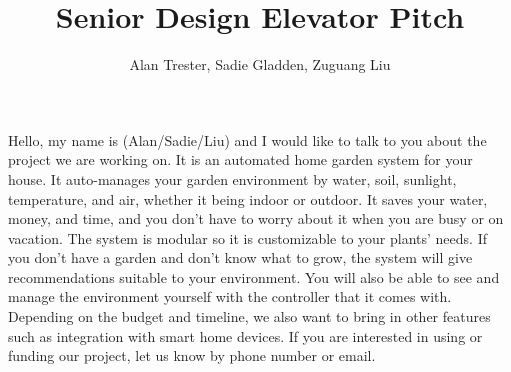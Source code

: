 \documentclass[14pt]{article}
\title{Senior Design Elevator Pitch}
\author{Alan Trester, Sadie Gladden, Zuguang Liu}
\begin{document}
\maketitle

Hello, my name is (Alan/Sadie/Liu) and I would like to talk to you about the project we are working on. It is an automated home garden system for your house. It auto-manages your garden environment by water, soil, sunlight, temperature, and air, whether it being indoor or outdoor. It saves your water, money, and time, and you don't have to worry about it when you are busy or on vacation. The system is modular so it is customizable to your plants' needs. If you don't have a garden and don't know what to grow, the system will give recommendations suitable to your environment. You will also be able to see and manage the environment yourself with the controller that it comes with. Depending on the budget and timeline, we also want to bring in other features such as integration with smart home devices. If you are interested in using or funding our project, let us know by phone number or email. 
\end{document}
